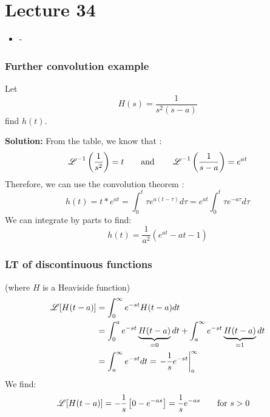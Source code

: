 
\chapter*{Lecture 34}

\begin{recall}{}{}
\begin{itemize}
\item -
\end{itemize}
\end{recall}




\subsection{Further convolution example}
\begin{exmp}{}
Let 
\begin{equation}
H(s)=\frac{1}{s^2(s-a)}
\end{equation}
find $h(t)$.

\textbf{Solution:}
From the table, we know that :
\begin{equation*}
\operatorname{\mathscr{L}}^{-1}\left(\frac{1}{s^2}\right)= t \qquad \text{and} \qquad \operatorname{\mathscr{L}}^{-1}\left(\frac{1}{s-a}\right)= e^{at} 
\end{equation*}
Therefore, we can use the convolution theorem :
\begin{equation*}
h(t)=t * e^{at}=\int^t_0\tau e^{a(t-\tau)}d\tau = e^{at} \int^t_0\tau e^{-a\tau}d\tau
\end{equation*}
We can integrate by parts to find:
\begin{equation*}
h(t)=\frac{1}{a^2}\left(e^{at}-at-1\right)
\end{equation*}


\end{exmp}


\subsection{LT of discontinuous functions}
(where $H$ is a Heaviside function)
\begin{align*}
\operatorname{\mathscr{L}}[H(t-a)]&=\int^\infty_0 e^{-st}H(t-a) dt\\
&=\int^a_0 e^{-st}\underbrace{H(t-a)}_{=0}dt+\int^\infty_a e^{-st}\underbrace{H(t-a)}_{=1}dt\\
&=\int^\infty_a e^{-st}dt=\left.-\frac{1}{s}e^{-st}\right|^\infty_a
\end{align*}
We find:
\begin{align*}
\operatorname{\mathscr{L}}[H(t-a)]&=-\frac{1}{s}\left[0-e^{-as}\right]=\frac{1}{s}e^{-as} \qquad \text{for } s>0
\end{align*}

